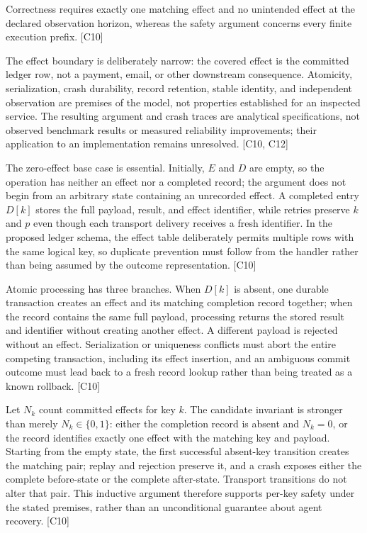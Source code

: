 \documentclass[11pt]{article}
\begin{document}
Correctness requires exactly one matching effect and no unintended effect at the declared observation horizon, whereas the safety argument concerns every finite execution prefix. [C10]

The effect boundary is deliberately narrow: the covered effect is the committed ledger row, not a payment, email, or other downstream consequence. Atomicity, serialization, crash durability, record retention, stable identity, and independent observation are premises of the model, not properties established for an inspected service. The resulting argument and crash traces are analytical specifications, not observed benchmark results or measured reliability improvements; their application to an implementation remains unresolved. [C10, C12]

The zero-effect base case is essential. Initially, $E$ and $D$ are empty, so the operation has neither an effect nor a completed record; the argument does not begin from an arbitrary state containing an unrecorded effect. A completed entry $D[k]$ stores the full payload, result, and effect identifier, while retries preserve $k$ and $p$ even though each transport delivery receives a fresh identifier. In the proposed ledger schema, the effect table deliberately permits multiple rows with the same logical key, so duplicate prevention must follow from the handler rather than being assumed by the outcome representation. [C10]

Atomic processing has three branches. When $D[k]$ is absent, one durable transaction creates an effect and its matching completion record together; when the record contains the same full payload, processing returns the stored result and identifier without creating another effect. A different payload is rejected without an effect. Serialization or uniqueness conflicts must abort the entire competing transaction, including its effect insertion, and an ambiguous commit outcome must lead back to a fresh record lookup rather than being treated as a known rollback. [C10]

Let $N_k$ count committed effects for key $k$. The candidate invariant is stronger than merely $N_k\in\{0,1\}$: either the completion record is absent and $N_k=0$, or the record identifies exactly one effect with the matching key and payload. Starting from the empty state, the first successful absent-key transition creates the matching pair; replay and rejection preserve it, and a crash exposes either the complete before-state or the complete after-state. Transport transitions do not alter that pair. This inductive argument therefore supports per-key safety under the stated premises, rather than an unconditional guarantee about agent recovery. [C10]
\end{document}
